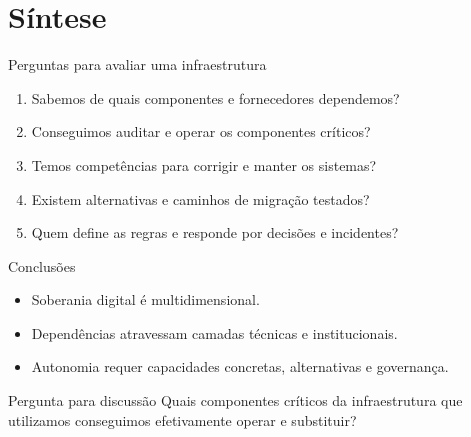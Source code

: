 \section{Síntese}

\begin{frame}{Perguntas para avaliar uma infraestrutura}
  \begin{enumerate}
    \item Sabemos de quais componentes e fornecedores dependemos?
    \item Conseguimos auditar e operar os componentes críticos?
    \item Temos competências para corrigir e manter os sistemas?
    \item Existem alternativas e caminhos de migração testados?
    \item Quem define as regras e responde por decisões e incidentes?
  \end{enumerate}
\end{frame}

\begin{frame}{Conclusões}
  \begin{itemize}
    \item Soberania digital é multidimensional.
    \item Dependências atravessam camadas técnicas e institucionais.
    \item Autonomia requer capacidades concretas, alternativas e governança.
  \end{itemize}
  \vspace{1em}
  \begin{block}{Pergunta para discussão}
    Quais componentes críticos da infraestrutura que utilizamos conseguimos efetivamente operar e substituir?
  \end{block}
\end{frame}
